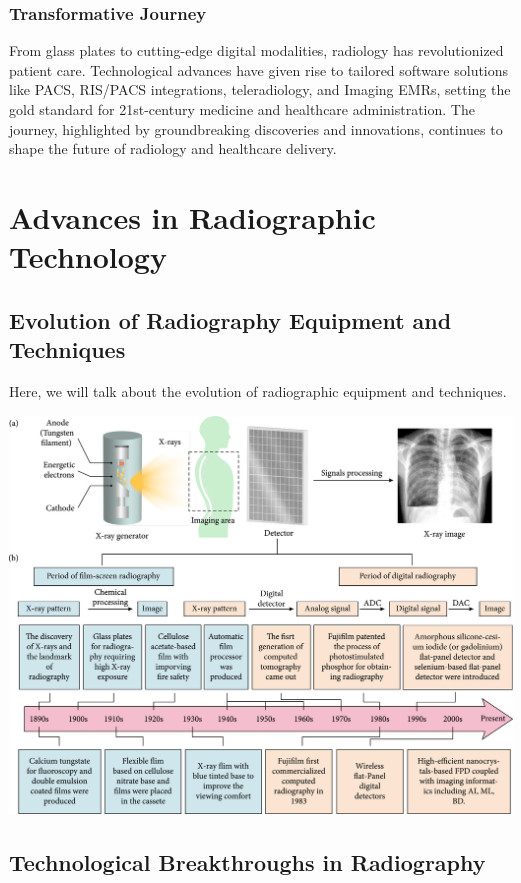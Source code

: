 \documentclass[a4paper,12pt]{report}
\begin{document}
\subsection{Transformative Journey}
From glass plates to cutting-edge digital modalities, radiology has revolutionized patient care.
Technological advances have given rise to tailored software solutions like PACS, RIS/PACS
integrations, teleradiology, and Imaging EMRs, setting the gold standard for 21st-century medicine
and healthcare administration. The journey, highlighted by groundbreaking discoveries and
innovations, continues to shape the future of radiology and healthcare delivery.

\chapter{Advances  in Radiographic Technology}
\section{Evolution of Radiography Equipment and Techniques}
Here, we will talk about the evolution of radiographic equipment and techniques. 
 
\begin{center}
  \includegraphics[scale = 0.5]{chrono.jpg}
  \label{chrono}
\end{center}

\section{	Technological Breakthroughs in Radiography}
\end{document}
